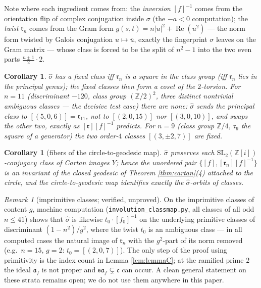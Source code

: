 \documentclass[11pt]{amsart}
\numberwithin{equation}{section}
\theoremstyle{plain}
\newtheorem{corollary}[theorem]{Corollary}
\theoremstyle{definition}
\theoremstyle{remark}
\newtheorem{remark}[theorem]{Remark}
\newcommand{\Z}{\mathbb{Z}}
\newcommand{\Zi}{\Z[i]}
\newcommand{\SL}{\mathrm{SL}}
\newcommand{\re}{\operatorname{Re}}
\newcommand{\ideala}{\mathfrak{a}}
\newcommand{\idealc}{\mathfrak{c}}
\newcommand{\idealr}{\mathfrak{r}}
\newcommand{\ideals}{\mathfrak{s}}
\begin{document}
Note where each ingredient comes from: the \emph{inversion} $[f]^{-1}$
comes from the orientation flip of complex conjugation inside $\sigma$
(the $-a < 0$ computation); the \emph{twist} $\idealr_n$ comes from the
Gram form $g(s, t) = n|u|^2 + \re(u^2)$ --- the norm form twisted by
Galois conjugation $u \mapsto \bar u$, exactly the fingerprint $\sigma$
leaves on the Gram matrix --- whose class is forced to be the split of
$n^2 - 1$ into the two even parts $\tfrac{n\pm1}{2}\cdot 2$.

\begin{corollary}\label{cor:fixedclasses}
$\hat\sigma$ has a fixed class iff $\idealr_n$ is a square in the class
group (iff $\idealr_n$ lies in the principal genus); the fixed classes
then form a coset of the $2$-torsion.  For $n = 11$ (discriminant
$-120$, class group $(\Z/2)^2$, three distinct nontrivial ambiguous
classes --- the decisive test case) there are none: $\hat\sigma$ sends
the principal class to $[(5, 0, 6)] = \idealr_{11}$, not to
$[(2, 0, 15)]$ nor $[(3, 0, 10)]$, and swaps the other two, exactly as
$[\idealr][f]^{-1}$ predicts.  For $n = 9$ (class group $\Z/4$,
$\idealr_9$ the square of a generator) the two order-$4$ classes
$[(3, \pm 2, 7)]$ are fixed.
\end{corollary}

\begin{corollary}[fibers of the circle-to-geodesic map]
\label{cor:geodesicfibers}
$\hat\sigma$ preserves each $\SL_2(\Zi)$-conjugacy class of Cartan
images $Y$; hence the unordered pair $\{[f], [\idealr_n][f]^{-1}\}$ is
an invariant of the closed geodesic of Theorem \ref{thm:cartan}(4)
attached to the circle, and the circle-to-geodesic map identifies
exactly the $\hat\sigma$-orbits of classes.
\end{corollary}

\begin{remark}[imprimitive classes; verified, unproved]
\label{rem:imprimitive}
On the imprimitive classes of content $g$, machine computation
(\texttt{involution\_classmap.py}, all classes of all odd $n \le 41$)
shows that $\hat\sigma$ is likewise $t_0\cdot[f_0]^{-1}$ on the
underlying primitive classes of discriminant $(1 - n^2)/g^2$, where the
twist $t_0$ is an ambiguous class --- in all computed cases the natural
image of $\idealr_n$ with the $g^2$-part of its norm removed (e.g.\
$n = 15$, $g = 2$: $t_0 = [(2, 0, 7)]$).  The only step of the proof
using primitivity is the index count in Lemma \ref{lem:lemmaC}; at the
ramified prime $2$ the ideal $\ideala_f$ is not proper and
$\ideals\ideala_f \subsetneq \idealc$ can occur.  A clean general
statement on these strata remains open; we do not use them anywhere in
this paper.
\end{remark}
\end{document}
